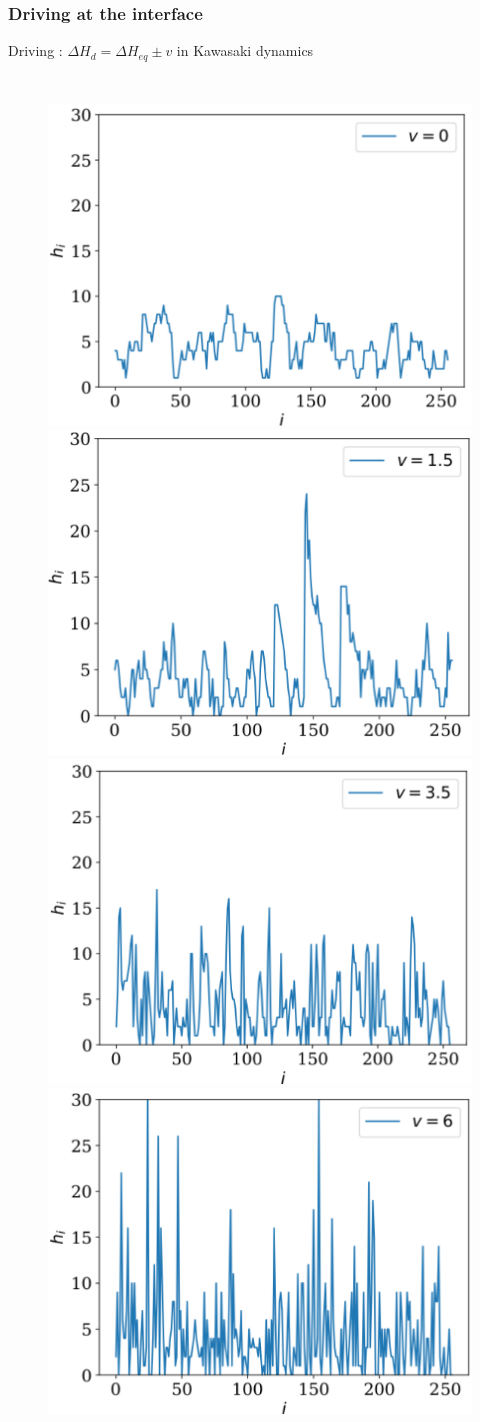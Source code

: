 \documentclass[9pt, dvipsnames,aspectratio=169]{beamer} %
\begin{document}
\begin{frame}
	\frametitle{Driving at the interface}
		Driving : $\Delta H_{d} = \Delta H_{eq} \pm v$ in Kawasaki dynamics \\
		\vspace{0.3cm}
		\begin{columns}
		\begin{figure}
			\includegraphics[width=0.45\linewidth]{sos-driving-snaps0.pdf}		
			\includegraphics[width=0.45\linewidth]{sos-driving-snaps1.pdf}	\\
			\includegraphics[width=0.45\linewidth]{sos-driving-snaps3.pdf}		
			\includegraphics[width=0.45\linewidth]{sos-driving-snaps6.pdf}										\end{figure}				

\end{columns}
\end{frame}
\end{document}
